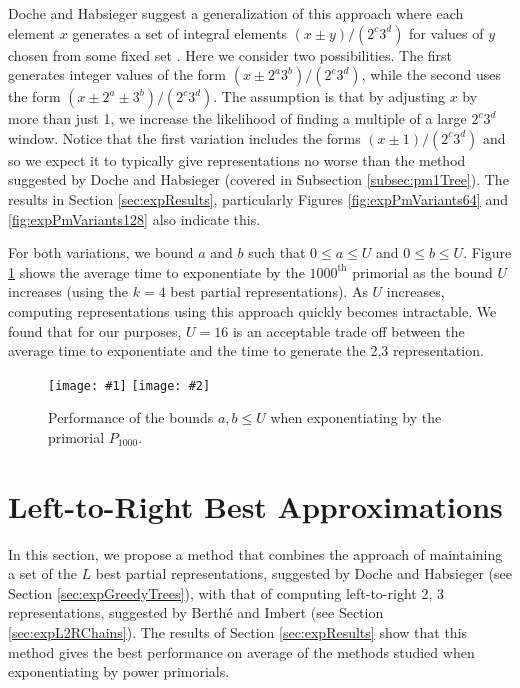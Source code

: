 \documentclass{ucalgthes1}
\theoremstyle{definition}
\newcommand{\mygraphTwoX}[5]{
	\begin{figure}[htb]
	\centering
	\texttt{[image: \#1]}
	\texttt{[image: \#2]}
	\caption[#5]{#4}
	\label{#3}
	\end{figure}
}
\begin{document}
Doche and Habsieger suggest a generalization of this approach where each element $x$ generates a set of integral elements $(x \pm y)/(2^c3^d)$ for values of $y$ chosen from some fixed set \cite[\S 5]{Doche2008}.  Here we consider two possibilities.  The first generates integer values of the form $(x \pm 2^a3^b)/(2^c3^d)$, while the second uses the form $(x \pm 2^a \pm 3^b) / (2^c 3^d)$.  The assumption is that by adjusting $x$ by more than just 1, we increase the likelihood of finding a multiple of a large $2^c3^d$ window.  Notice that the first variation includes the forms $(x \pm 1)/(2^c 3^d)$ and so we expect it to typically give representations no worse than the method suggested by Doche and Habsieger \cite{Doche2008} (covered in Subsection \ref{subsec:pm1Tree}).  The results in Section \ref{sec:expResults}, particularly Figures \ref{fig:expPmVariants64} and \ref{fig:expPmVariants128} also indicate this.

For both variations, we bound $a$ and $b$ such that $0 \le a \le U$ and $0 \le b \le U$.  Figure \ref{fig:pm2a3bVaryMax} shows the average time to exponentiate by the $1000^{\textrm{th}}$ primorial as the bound $U$ increases (using the $k=4$ best partial representations).  As $U$ increases, computing representations using this approach quickly becomes intractable.  We found that for our purposes, $U=16$ is an acceptable trade off between the average time to exponentiate and the time to generate the 2,3 representation.

\mygraphTwoX{pm2a3b_vary_max-64}{pm2a3b_vary_max-128}{fig:pm2a3bVaryMax}{Performance of the bounds $a, b \le U$ when exponentiating by the primorial $P_{1000}$.}{Global Bounds on Pruned Trees.}

\clearpage


\section{Left-to-Right Best Approximations}
\label{sec:expBestApproximations}

In this section, we propose a method that combines the approach of maintaining a set of the $L$ best partial representations, suggested by Doche and Habsieger \cite{Doche2008} (see Section \ref{sec:expGreedyTrees}), with that of computing left-to-right 2, 3 representations, suggested by Berth{\'e} and Imbert \cite{Berthe2009} (see Section \ref{sec:expL2RChains}).  The results of Section \ref{sec:expResults} show that this method gives the best performance on average of the methods studied when exponentiating by power primorials.
\end{document}

